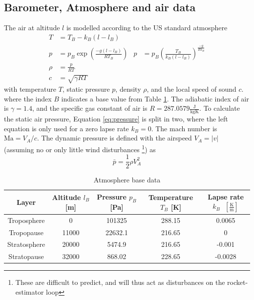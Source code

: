 \subsection{Barometer, Atmosphere and air data}
The air at altitude $l$ is modelled according to the US standard atmosphere \cite{stengel2004}
\begin{align}
    T &= T_B - k_B (l-l_B) \label{eq:model-atmos1} \\ 
    p &= p_B \exp \left( \frac{-g (l-l_B)}{R T_B} \right) &
    p &= p_B \left( \frac{T_B}{k_B (l-l_B)} \right) ^\frac{-g}{R k_B} \label{eq:pressure}\\
    \rho &= \frac{p}{R T} \\
    c &= \sqrt{\gamma R T} \label{eq:model-atmos5}
\end{align}
with temperature $T$, static pressure $p$, density $\rho$, and the local speed of sound $c$.
where the index $B$ indicates a base value from Table \ref{tab:atmosphere}. 
The adiabatic index of air is $\gamma = 1.4$, and the specific gas constant of air is $R = 287.0579 \frac{\mathrm{J}}{\mathrm{kg K}}$.
To calculate the static air pressure, Equation \ref{eq:pressure} is split in two, where the left equation is only used for a zero lapse rate $k_B = 0$.
The mach number is $\mathrm{Ma} = V_A / c $.
The dynamic pressure is defined with the airspeed $V_A = |v|$ (assuming no or only little wind disturbances \footnote{These are difficult to predict, and will thus act as disturbances on the rocket-estimator loop}) as \cite{stengel2004}
\begin{equation}
    \bar p = \frac{1}{2} \rho V_A^2
\end{equation}


\begin{table}[!ht]
\begin{center}
\begin{tabular}{c c c c c}
Layer & Altitude $l_B$ [m] & Pressure $p_B$ [Pa] & Temperature $T_B$ [K] & Lapse rate $k_B \text{ } [\frac{\mathrm{K}}{\mathrm{m}}]$  \\
\hline %
Troposphere & 0 & 101325 & 288.15 & 0.0065 \\
Tropopause & 11000 & 22632.1 & 216.65 & 0 \\
Stratosphere & 20000 & 5474.9 & 216.65 & -0.001 \\ 
Stratopause & 32000 & 868.02 & 228.65 & -0.0028 \\
\end{tabular}
\end{center}
\caption{Atmosphere base data} \label{tab:atmosphere}
\end{table}

